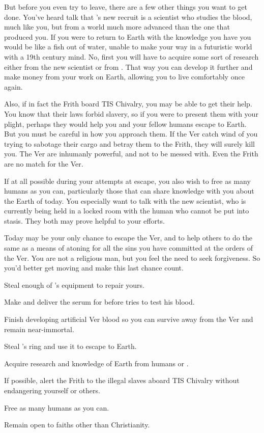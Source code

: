 \documentclass[char]{guildcamp4}
\begin{document}
But before you even try to leave, there are a few other things you want to get done. You've heard talk that \cVone{}'s new recruit is a scientist who studies the blood, much like you, but from a world much more advanced than the one that produced you. If you were to return to Earth with the knowledge you have you would be like a fish out of water, unable to make your way in a futuristic world with a 19th century mind. No, first you will have to acquire some sort of research either from the new scientist or from \cVthree{}. That way you can develop it further and make money from your work on Earth, allowing you to live comfortably once again.

Also, if in fact the Frith board TIS Chivalry, you may be able to get their help. You know that their laws forbid slavery, so if you were to present them with your plight, perhaps they would help you and your fellow humans escape to Earth. But you must be careful in how you approach them. If the Ver catch wind of you trying to sabotage their cargo and betray them to the Frith, they will surely kill you. The Ver are inhumanly powerful, and not to be messed with. Even the Frith are no match for the Ver.

If at all possible during your attempts at escape, you also wish to free as many humans as you can, particularly those that can share knowledge with you about the Earth of today. You especially want to talk with the new scientist, who is currently being held in a locked room with the human who cannot be put into stasis. They both may prove helpful to your efforts.

Today may be your only chance to escape the Ver, and to help others to do the same as a means of atoning for all the sins you have committed at the orders of the Ver. You are not a religious man, but you feel the need to seek forgiveness. So you'd better get moving and make this last chance count.

\begin{itemz}[Goals]
	\item Steal enough of \cVthree{}'s equipment to repair yours.
	\item Make and deliver the serum for \cRasputin{} before \cVthree{} tries to test his blood.
	\item Finish developing artificial Ver blood so you can survive away from the Ver and remain near-immortal.
	\item Steal \cVone{}'s ring and use it to escape to Earth.
	\item Acquire research and knowledge of Earth from humans or \cVthree{}.
	\item If possible, alert the Frith to the illegal slaves aboard TIS Chivalry without endangering yourself or others.
	\item Free as many humans as you can.
	\item Remain open to faiths other than Christianity.
\end{itemz}
\end{document}

